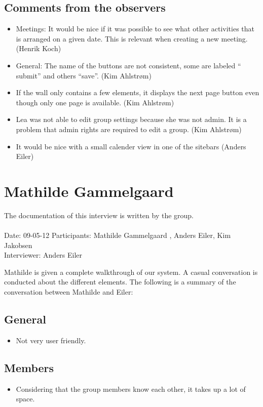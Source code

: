\subsection*{Comments from the observers}
\begin{itemize}
	\item Meetings: It would be nice if it was possible to see what other activities that is arranged on a given date. This is relevant when creating a new meeting.(Henrik Koch)
	\item General: The name of the buttons are not consistent, some are labeled `` submit'' and others ``save''. (Kim Ahlstrøm)
	\item If the wall only contains a few elements, it displays the next page button even though only one page is available. (Kim Ahlstrøm)
	\item Lea was not able to edit group settings because she was not admin. It is a problem that admin rights are required to edit a group. (Kim Ahlstrøm)
	\item It would be nice with a small calender view in one of the sitebars (Anders Eiler)
\end{itemize}


\section{Mathilde Gammelgaard}
\label{app:mathildedemo}
The documentation of this interview is written by the \timelinegroup{} group. \\ \ \\
Date: 09-05-12
Participants: Mathilde Gammelgaard , Anders Eiler, Kim Jakobsen \\
Interviewer: Anders Eiler

Mathilde is given a complete walkthrough of our system.
A casual conversation is conducted about the different elements.
The following is a summary of the conversation between Mathilde and Eiler:

\subsection*{General}
\begin{itemize}
	\item Not very user friendly.
\end{itemize}


\subsection*{Members}
\begin{itemize}
	\item Considering that the group members know each other, it takes up a lot of space.
\end{itemize}


